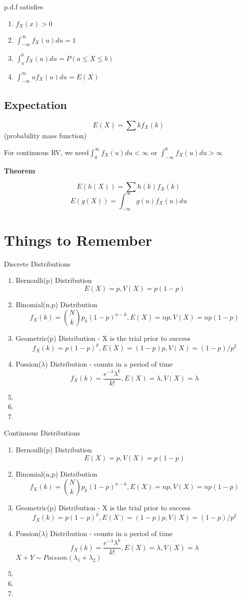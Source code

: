 \documentclass[11pt, openany]{book}              %
\begin{document}
p.d.f satisfies 
\begin{enumerate}
	\item $f_X(x) > 0$ 
	\item $ \int_{-\infty}^{\infty}f_X(u)du=1$
	\item $ \int_{a}^{b}f_X(u)du=P(a \leq X \leq b)$
	\item $ \int_{-\infty}^{\infty}u f_X(u)du=E(X)$
\end{enumerate}

\subsection{Expectation}

$$E(X) = \sum k f_X(k)$$ (probability mass function)

For continuous RV, we need$ \int_{0}^{\infty}f_X(u)du < \infty$ or $ \int_{-\infty}^0   f_X(u)du> \infty$

\textbf{Theorem}

$$ E(h(X)) = \sum h(k) f_X(k)$$
$$ E(g(X)) = \int_{-\infty}^{\infty} g(u) f_X(u)du$$
$$$$
$$$$
$$$$
$$$$
$$$$
$$$$
$$$$
$$$$
$$$$

\section{Things to Remember}
Discrete Distributions
\begin{enumerate}
	\item Bernoulli(p) Distribution
	$$ E(X) = p, V(X) = p(1-p)$$
	\item Binomial(n,p) Distribution
	 $$ f_X(k) = {N \choose k} p_k (1-p)^{n-k}, E(X) = np, V(X) = np(1-p) $$
	\item Geometric(p) Distribution - X is the trial prior to success
	$$ f_X(k) =  p (1-p)^k, E(X) = (1-p)p , V(X) = (1-p)/p^2$$
	\item Possion($\lambda$) Distribution - counts in a period of time
    $$ f_X(k) =  \frac{e^{-\lambda}\lambda^k}{k!}, E(X) = \lambda, V(X) = \lambda $$
	\item 	\item 	\item  
\end{enumerate}
Continuous Distributions
\begin{enumerate}
	\item Bernoulli(p) Distribution
	$$ E(X) = p, V(X) = p(1-p)$$
	\item Binomial(n,p) Distribution
	 $$ f_X(k) = {N \choose k} p_k (1-p)^{n-k}, E(X) = np, V(X) = np(1-p) $$
	\item Geometric(p) Distribution - X is the trial prior to success
	$$ f_X(k) =  p (1-p)^k, E(X) = (1-p)p , V(X) = (1-p)/p^2$$
	\item Possion($\lambda$) Distribution - counts in a period of time
    $$ f_X(k) =  \frac{e^{-\lambda}\lambda^k}{k!}, E(X) = \lambda, V(X) = \lambda $$
    $X + Y \sim Poisson(\lambda_1 + \lambda_2)$
	\item 	\item 	\item  
\end{enumerate}
\end{document}
